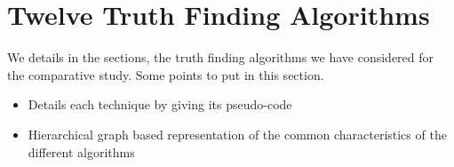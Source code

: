 \section{Twelve Truth Finding Algorithms}


We details in the sections, the truth finding 
algorithms we have considered for the comparative study.
Some points to put in this section.
\begin{itemize}
 \item Details each technique by giving its pseudo-code
 \item Hierarchical graph based representation of the common characteristics of the different algorithms
\end{itemize}
